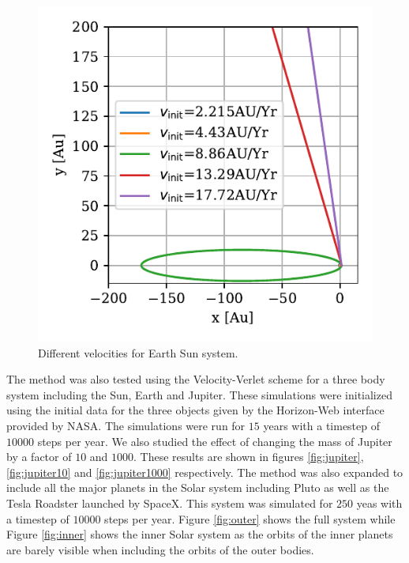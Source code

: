 \documentclass[twocolumn]{aastex62}
\begin{document}
\begin{figure}
\includegraphics[scale=1]{Figures/espace.pdf}
\caption{Different velocities for Earth Sun system.}
\label{fig:escape}
\end{figure}

The method was also tested using the Velocity-Verlet scheme for a three body system including the Sun, Earth and
Jupiter. These simulations were initialized using the initial data for the three
objects given by the Horizon-Web interface provided by NASA. The simulations
were run for $15$ years with a timestep of $10000$ steps per year. We also
studied the effect of changing the mass of Jupiter by a factor of $10$ and
$1000$. These results are shown in figures \ref{fig:jupiter},
\ref{fig:jupiter10} and \ref{fig:jupiter1000} respectively. The method was also
expanded to include all the major planets in the Solar system including Pluto as
well as the Tesla Roadster launched by SpaceX. This system was simulated for
$250$ yeas with a timestep of $10000$ steps per year. Figure \ref{fig:outer}
shows the full system while Figure \ref{fig:inner} shows the inner Solar system
as the orbits of the inner planets are barely visible when including the orbits
of the outer bodies.
\end{document}
